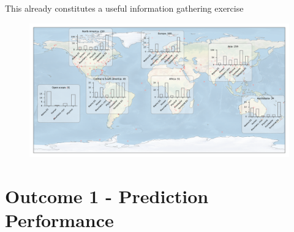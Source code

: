 \documentclass[9pt]{beamer}
\begin{document}
\begin{frame}{This already constitutes a useful information gathering exercise}

\begin{figure}
	\includegraphics[width=\linewidth]{../plots/map_coded.pdf}
\end{figure}

\end{frame}

\section{Outcome 1 - Prediction Performance}
\begin{frame}
\tableofcontents[currentsection]
\end{frame}
\end{document}
